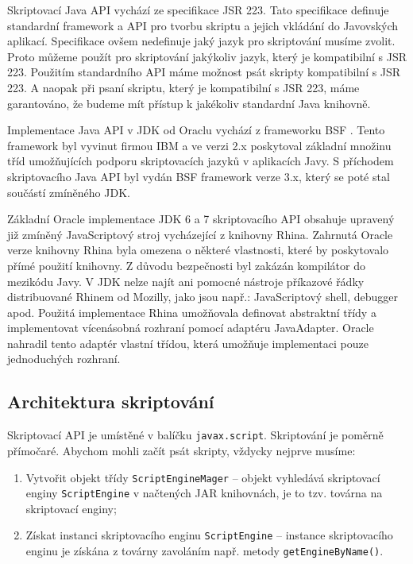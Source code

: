 Skriptovací Java API vychází ze specifikace JSR 223. Tato specifikace definuje standardní framework a API pro tvorbu skriptu a jejich vkládání do Javovských aplikací. Specifikace ovšem nedefinuje jaký jazyk pro skriptování musíme zvolit. Proto můžeme použít pro skriptování jakýkoliv jazyk, který je kompatibilní s JSR 223. Použitím standardního API máme možnost psát skripty kompatibilní s JSR 223. A naopak při psaní skriptu, který je kompatibilní s JSR 223, máme garantováno, že budeme mít přístup k jakékoliv standardní Java knihovně.

Implementace Java API v JDK od Oraclu vychází z frameworku BSF \cite{Bibliography.BSF.Framework}. Tento framework byl vyvinut firmou IBM a ve verzi 2.x poskytoval základní množinu tříd umožňujících podporu skriptovacích jazyků v aplikacích Javy. S příchodem skriptovacího Java API byl vydán BSF framework verze 3.x, který se poté stal součástí zmíněného JDK.

Základní Oracle implementace JDK 6 a 7 skriptovacího API obsahuje upravený již zmíněný JavaScriptový stroj vycházející z knihovny Rhina. Zahrnutá Oracle verze knihovny Rhina byla omezena o některé vlastnosti, které by poskytovalo přímé použití knihovny. Z důvodu bezpečnosti byl zakázán kompilátor do mezikódu Javy. V JDK nelze najít ani pomocné nástroje příkazové řádky distribuované Rhinem od Mozilly, jako jsou např.: JavaScriptový shell, debugger apod. Použitá implementace Rhina umožňovala definovat abstraktní třídy a implementovat vícenásobná rozhraní pomocí adaptéru JavaAdapter. Oracle nahradil tento adaptér vlastní třídou, která umožňuje implementaci pouze jednoduchých rozhraní. 

\subsection{Architektura skriptování}
\label{Chapter.JavaScriptInJavaAnalysis.ScriptingJavaAPI.ArchitectureOfScripting}

\bigskip \noindent Skriptovací API je umístěné v balíčku \texttt{javax.script}. Skriptování je poměrně přímočaré. Abychom mohli začít psát skripty, vždycky nejprve musíme:

\begin{enumerate}
  \item Vytvořit objekt třídy \texttt{ScriptEngineMager} -- objekt vyhledává skriptovací enginy \texttt{ScriptEngine} v načtených JAR knihovnách, je to tzv. továrna na skriptovací enginy;
  \item Získat instanci skriptovacího enginu \texttt{ScriptEngine} -- instance skriptovacího enginu je získána z továrny zavoláním např. metody \texttt{getEngineByName()}. 
\end{enumerate}

